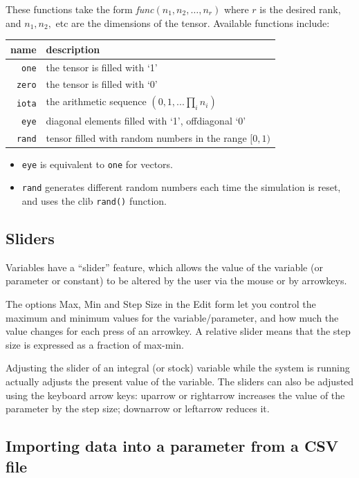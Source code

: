 These functions take the form {\em func}$(n_{1},n_{2},\ldots,n_{r})$
where $r$ is the desired rank, and $n_{1},n_{2},$ etc are the dimensions
of the tensor. Available functions include:

\begin{tabular}{|r|l|}
\hline 
name  & description\tabularnewline
\hline 
\verb+one+ & the tensor is filled with `1'\tabularnewline
\verb+zero+ & the tensor is filled with `0'\tabularnewline
\verb+iota+ & the arithmetic sequence $(0,1,...\prod_{i}n_{i})$\tabularnewline
\verb+eye+ & diagonal elements filled with `1', offdiagonal `0'\tabularnewline
\verb+rand+ & tensor filled with random numbers in the range $[0,1)$\tabularnewline
\hline 
\end{tabular}
\begin{itemize}
\item \verb+eye+ is equivalent to \verb+one+ for vectors. 
\item \verb+rand+ generates different random numbers each time the simulation
is reset, and uses the clib \verb+rand()+ function. 
\end{itemize}

\subsection{Sliders}

Variables have a ``slider'' feature, which allows the value of the
variable (or parameter or constant) to be altered by the user via
the mouse or by arrowkeys.

The options Max, Min and Step Size in the Edit form let you control
the maximum and minimum values for the variable/parameter, and how
much the value changes for each press of an arrowkey. A relative slider
means that the step size is expressed as a fraction of max-min.

Adjusting the slider of an integral (or stock) variable while the
system is running actually adjusts the present value of the variable.
The sliders can also be adjusted using the keyboard arrow keys: uparrow
\textuparrow{} or rightarrow \textrightarrow{} increases the value
of the parameter by the step size; downarrow \textdownarrow or leftarrow
\textleftarrow{} reduces it.

\subsection{Importing data into a parameter from a CSV file}

